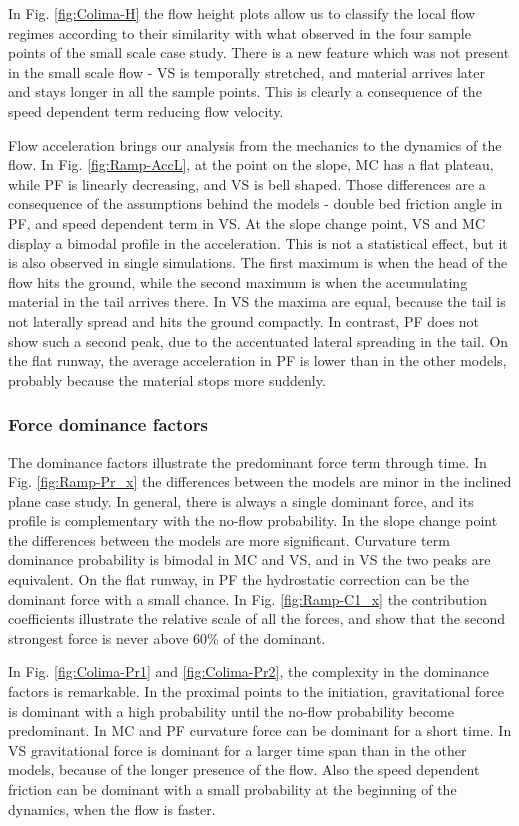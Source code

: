 \documentclass{article}
\begin{document}
In Fig. \ref{fig:Colima-H} the flow height plots allow us to classify the local flow regimes according to their similarity with what observed in the four sample points of the small scale case study. There is a new feature which was not present in the small scale flow - VS is temporally stretched, and material arrives later and stays longer in all the sample points. This is clearly a consequence of the speed dependent term reducing flow velocity.

Flow acceleration brings our analysis from the mechanics to the dynamics of the flow. In Fig. \ref{fig:Ramp-AccL}, at the point on the slope, MC has a flat plateau, while PF is linearly decreasing, and VS is bell shaped. Those differences are a consequence of the assumptions behind the models - double bed friction angle in PF, and speed dependent term in VS. At the slope change point, VS and MC display a bimodal profile in the acceleration. This is not a statistical effect, but it is also observed in single simulations. The first maximum is when the head of the flow hits the ground, while the second maximum is when the accumulating material in the tail arrives there. In VS the maxima are equal, because the tail is not laterally spread and hits the ground compactly. In contrast, PF does not show such a second peak, due to the accentuated lateral spreading in the tail. On the flat runway, the average acceleration in PF is lower than in the other models, probably because the material stops more suddenly.

\subsubsection{Force dominance factors}
The dominance factors illustrate the predominant force term through time. In Fig. \ref{fig:Ramp-Pr_x} the differences between the models are minor in the inclined plane case study. In general, there is always a single dominant force, and its profile is complementary with the no-flow probability. In the slope change point the differences between the models are more significant. Curvature term dominance probability is bimodal in MC and VS, and in VS the two peaks are equivalent. On the flat runway, in PF the hydrostatic correction can be the dominant force with a small chance. In Fig. \ref{fig:Ramp-C1_x} the contribution coefficients illustrate the relative scale of all the forces, and show that the second strongest force is never above 60\% of the dominant. 

In Fig. \ref{fig:Colima-Pr1} and \ref{fig:Colima-Pr2}, the complexity in the dominance factors is remarkable. In the proximal points to the initiation, gravitational force is dominant with a high probability until the no-flow probability become predominant. In MC and PF curvature force can be dominant for a short time. In VS gravitational force is dominant for a larger time span than in the other models, because of the longer presence of the flow. Also the speed dependent friction can be dominant with a small probability at the beginning of the dynamics, when the flow is faster.
\end{document}
